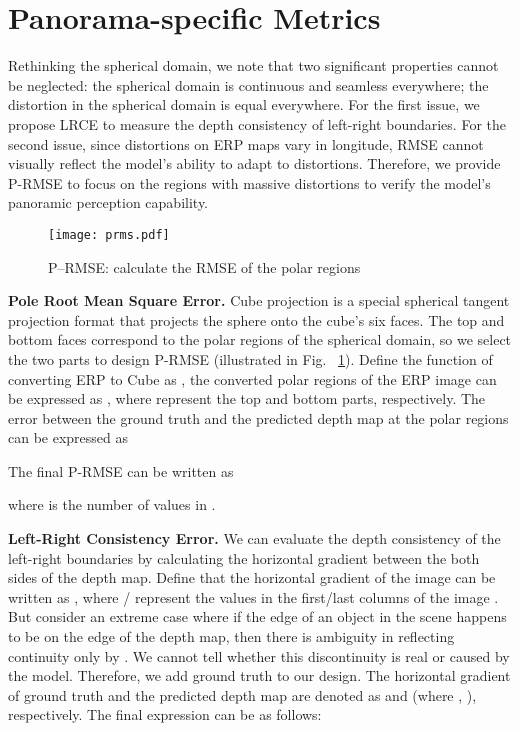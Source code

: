 \documentclass[runningheads]{llncs}
\begin{document}
\section{Panorama-specific Metrics}
\label{section4}
Rethinking the spherical domain, we note that two significant properties cannot be neglected: the spherical domain is continuous and seamless everywhere; the distortion in the spherical domain is equal everywhere. For the first issue, we propose LRCE to measure the depth consistency of left-right boundaries. For the second issue, since distortions on ERP maps vary in longitude, RMSE cannot visually reflect the model's ability to adapt to distortions. Therefore, we provide P-RMSE to focus on the regions with massive distortions to verify the model's panoramic perception capability.\begin{figure}[H]
  \centering
  \texttt{[image: prms.pdf]} \caption{P--RMSE: calculate the RMSE of the polar regions} \label{fig:prmse}
\end{figure}
\noindent \textbf{Pole Root Mean Square Error.} Cube projection is a special spherical tangent projection format that projects the sphere onto the cube's six faces. The top and bottom faces correspond to the polar regions of the spherical domain, so we select the two parts to design P-RMSE (illustrated in Fig. ~\ref{fig:prmse}). Define the function of converting ERP to Cube as , the converted polar regions of the ERP image  can be expressed as , where  represent the top and bottom parts, respectively. The error  between the ground truth  and the predicted depth map  at the polar regions can be expressed as  

The final P-RMSE can be written as

where  is the number of values in .

\noindent \textbf{Left-Right Consistency Error.}
We can evaluate the depth consistency of the left-right boundaries by calculating the horizontal gradient between the both sides of the depth map. Define that the horizontal gradient  of the image  can be written as , where /  represent the values in the first/last columns of the image . But consider an extreme case where if the edge of an object in the scene happens to be on the edge of the depth map, then there is ambiguity in reflecting continuity only by . We cannot tell whether this discontinuity is real or caused by the model. Therefore, we add ground truth to our design. The horizontal gradient of ground truth and the predicted depth map are denoted as  and  (where , ), respectively. The final expression can be as follows:
\end{document}

